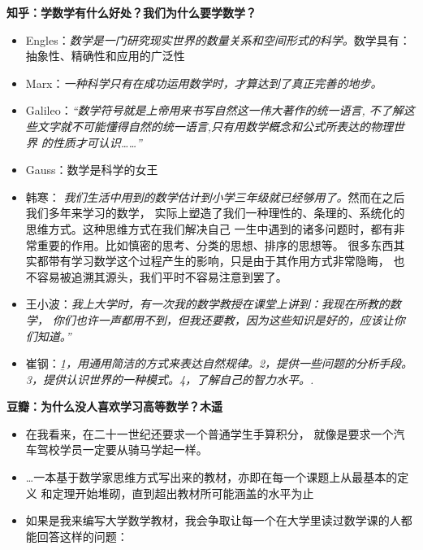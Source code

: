 \begin{shaded}
	{\bf 知乎：学数学有什么好处？我们为什么要学数学？}
	\begin{itemize}
	  \item Engles：{\it 数学是一门研究现实世界的数量关系和空间形式的科学。}数学具有：
	  抽象性、精确性和应用的广泛性
	  \item Marx：{\it 一种科学只有在成功运用数学时，才算达到了真正完善的地步。}
	  \item Galileo：{\it “数学符号就是上帝用来书写自然这一伟大著作的统一语言,
	  不了解这些文字就不可能懂得自然的统一语言,只有用数学概念和公式所表达的物理世界
	  的性质才可认识……”}
	  \item Gauss：{数学是科学的女王}
	  \item 韩寒：{\it
	  我们生活中用到的数学估计到小学三年级就已经够用了。}然而在之后我们多年来学习的数学，
	  实际上塑造了我们一种理性的、条理的、系统化的思维方式。这种思维方式在我们解决自己
	  一生中遇到的诸多问题时，都有非常重要的作用。比如慎密的思考、分类的思想、排序的思想等。
	  很多东西其实都带有学习数学这个过程产生的影响，只是由于其作用方式非常隐晦，
	  也不容易被追溯其源头，我们平时不容易注意到罢了。
	  \item 王小波：{\it 我上大学时，有一次我的数学教授在课堂上讲到：我现在所教的数学，
	  你们也许一声都用不到，但我还要教，因为这些知识是好的，应该让你们知道。”}
	  \item 崔钢：{\it\b 1，用通用简洁的方式来表达自然规律。2，提供一些问题的分析手段。
	  3，提供认识世界的一种模式。4，了解自己的智力水平。.}
	\end{itemize}
	{\bf 豆瓣：为什么没人喜欢学习高等数学？木遥}
	\begin{itemize}
	  \item 在我看来，在二十一世纪还要求一个普通学生手算积分，
	  就像是要求一个汽车驾校学员一定要从骑马学起一样。
	  \item \ldots 一本基于数学家思维方式写出来的教材，亦即在每一个课题上从最基本的定义
	  和定理开始堆砌，直到超出教材所可能涵盖的水平为止
	  \item 如果是我来编写大学数学教材，我会争取让每一个在大学里读过数学课的人都能回答这样的问题：

\end{itemize}
\end{shaded}
